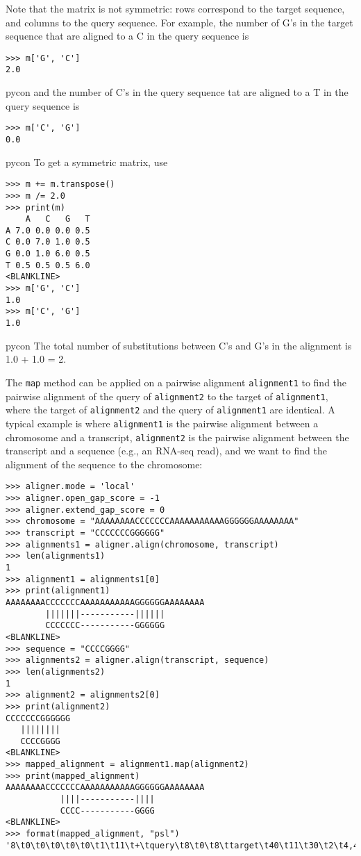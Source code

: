 Note that the matrix is not symmetric: rows correspond to the target sequence, and columns to the query sequence.  For example, the number of G's in the target sequence that are aligned to a C in the query sequence is
\begin{verbatim}
>>> m['G', 'C']
2.0
\end{verbatim}{pycon}
and the number of C's in the query sequence tat are aligned to a T in the query sequence is
\begin{verbatim}
>>> m['C', 'G']
0.0
\end{verbatim}{pycon}
To get a symmetric matrix, use
\begin{verbatim}
>>> m += m.transpose()
>>> m /= 2.0
>>> print(m)
    A   C   G   T
A 7.0 0.0 0.0 0.5
C 0.0 7.0 1.0 0.5
G 0.0 1.0 6.0 0.5
T 0.5 0.5 0.5 6.0
<BLANKLINE>
>>> m['G', 'C']
1.0
>>> m['C', 'G']
1.0
\end{verbatim}{pycon}
The total number of substitutions between C's and G's in the alignment is 1.0 + 1.0 = 2.

The \verb+map+ method can be applied on a pairwise alignment \verb+alignment1+ to find the pairwise alignment of the query of \verb+alignment2+ to the target of \verb+alignment1+, where the target of \verb+alignment2+ and the query of \verb+alignment1+ are identical. A typical example is where \verb+alignment1+ is the pairwise alignment between a chromosome and a transcript, \verb+alignment2+ is the pairwise alignment between the transcript and a sequence (e.g., an RNA-seq read), and we want to find the alignment of the sequence to the chromosome:
        
\begin{verbatim}
>>> aligner.mode = 'local'
>>> aligner.open_gap_score = -1
>>> aligner.extend_gap_score = 0
>>> chromosome = "AAAAAAAACCCCCCCAAAAAAAAAAAGGGGGGAAAAAAAA"
>>> transcript = "CCCCCCCGGGGGG"
>>> alignments1 = aligner.align(chromosome, transcript)
>>> len(alignments1)
1
>>> alignment1 = alignments1[0]
>>> print(alignment1)
AAAAAAAACCCCCCCAAAAAAAAAAAGGGGGGAAAAAAAA
        |||||||-----------||||||        
        CCCCCCC-----------GGGGGG        
<BLANKLINE>
>>> sequence = "CCCCGGGG"
>>> alignments2 = aligner.align(transcript, sequence)
>>> len(alignments2)
1
>>> alignment2 = alignments2[0]
>>> print(alignment2)
CCCCCCCGGGGGG
   ||||||||  
   CCCCGGGG  
<BLANKLINE>
>>> mapped_alignment = alignment1.map(alignment2)
>>> print(mapped_alignment)
AAAAAAAACCCCCCCAAAAAAAAAAAGGGGGGAAAAAAAA
           ||||-----------||||          
           CCCC-----------GGGG          
<BLANKLINE>
>>> format(mapped_alignment, "psl")
'8\t0\t0\t0\t0\t0\t1\t11\t+\tquery\t8\t0\t8\ttarget\t40\t11\t30\t2\t4,4,\t0,4,\t11,26,\n'
\end{verbatim}

